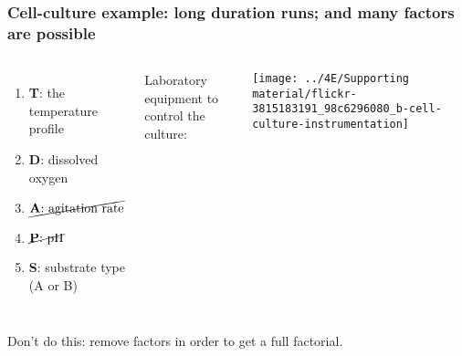 \begin{frame}\frametitle{Cell-culture example: long duration runs; and many factors are possible}
	\begin{columns}[c]
			\begin{enumerate}
				\item	\textbf{T}: the temperature profile
				\item	\textbf{D}: dissolved oxygen
				\item	$\cancel{\text{\textbf{A}: agitation rate}}$
				\item	$\cancel{\text{\textbf{P}: pH}}$
				\item	\textbf{S}: substrate type (A or B)
			\end{enumerate}
		
			{\color{blue} \small Laboratory equipment to control the culture:} 
			
			\vspace{0.2cm}
			
			\centerline{\texttt{[image: ../4E/Supporting material/flickr-3815183191\_98c6296080\_b-cell-culture-instrumentation]}}
	\end{columns}

	\vfill
	{\color{red} Don't do this:} remove factors in order to get a full factorial.
	
\end{frame}

